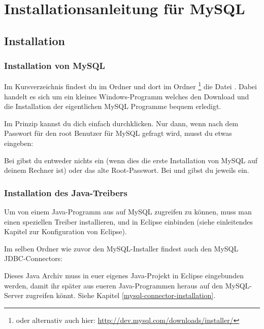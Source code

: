 \section{Installationsanleitung für MySQL}

\subsection{Installation}

\subsubsection{Installation von MySQL}

Im Kursverzeichnis findest du im Ordner  und dort
im Ordner \footnote{oder alternativ auch hier:
\url{http://dev.mysql.com/downloads/installer/}} die Datei
. Dabei handelt es sich um
ein kleines Windows-Programm welches den Download und die Installation der
eigentlichen MySQL Programme bequem erledigt.

Im Prinzip kannst du dich einfach durchklicken. Nur dann, wenn nach dem Passwort
für den root Benutzer für MySQL gefragt wird, musst du etwas eingeben: 

Bei  gibst du entweder nichts ein (wenn dies die
erste Installation von MySQL auf deinem Rechner ist) oder das alte
Root-Passwort. Bei  und  gibst
du jeweils  ein.


\subsubsection{Installation des Java-Treibers}

Um von einem Java-Programm aus auf MySQL zugreifen zu können, muss man einen speziellen Treiber
installieren, und in Eclipse einbinden (siehe einleitendes Kapitel zur
Konfiguration von Eclipse).

Im selben Ordner wie zuvor den MySQL-Installer findest auch den MySQL
JDBC-Connectors:


Dieses Java Archiv muss in euer eigenes Java-Projekt in Eclipse eingebunden
werden, damit ihr später aus eueren Java-Programmen heraus auf den MySQL-Server
zugreifen könnt. Siehe Kapitel \ref{mysql-connector-installation}.


